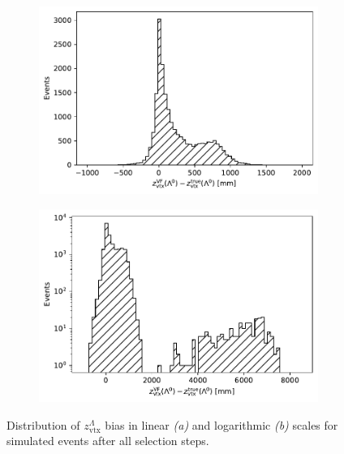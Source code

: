 
\begin{figure}[t]
	\centering
	\begin{subfigure}{.45\textwidth}
		\includegraphics[width=\textwidth]{graphics/05-angular_distributions/Lambda_endvertex_bias_z.pdf}
		\caption{}
		\label{fig:5:lz_endvertex_bias_linear}
	\end{subfigure}
	\begin{subfigure}{.45\textwidth}
		\includegraphics[width=\textwidth]{graphics/05-angular_distributions/Lambda_endvertex_bias_z_log.pdf}
		\caption{}
		\label{fig:5:lz_endvertex_bias_log}
	\end{subfigure}
	\caption{Distribution of $z_\text{vtx}^\Lambda$ bias in linear \textit{(a)} and logarithmic \textit{(b)} scales for simulated \demonstratorshort events after all selection steps.}
	\label{fig:5:lz_endvertex_bias}
\end{figure}

